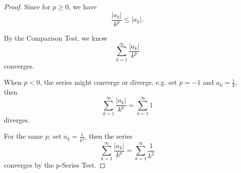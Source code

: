 \begin{Exercise}
\begin{proof}
Since for $p \geq 0$, we have 
$$
\frac{|a_k|}{k^p} \leq |a_k|.
$$

By the Comparison Test, we know 
$$
\sum_{k=1}^{\infty}\frac{|a_k|}{k^p}
$$
converges. 

When $p < 0$, the series might converge or diverge. e.g. set $p=-1$ and $a_k=\frac{1}{k}$, then 
$$
\sum_{k=1}^{\infty}\frac{|a_k|}{k^p} 
= \sum_{k=1}^{\infty}1
$$ 
diverges. 

For the same $p$, set $a_k = \frac{1}{k^3}$, then the series 
$$
\sum_{k=1}^{\infty}\frac{|a_k|}{k^p} 
= \sum_{k=1}^{\infty}\frac{1}{k^2}
$$ 
converges by the p-Series Test.
\end{proof}
\end{Exercise}